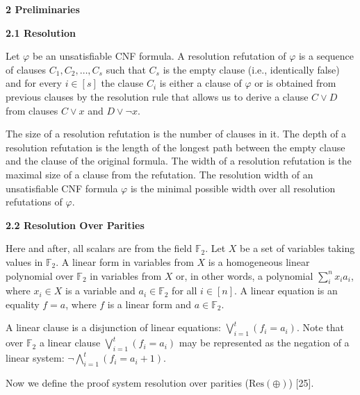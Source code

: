 \par\medskip\noindent\textbf{
2 Preliminaries}\par

\par\medskip\noindent\textbf{
2.1 Resolution}\par


Let $\varphi$ be an unsatisfiable CNF formula. A resolution refutation of $\varphi$ is a sequence of clauses $C_{1},C_{2},\dots,C_{s}$ such that $C_{s}$ is the empty clause (i.e., identically false) and for every $i\in[s]$ the clause $C_{i}$ is either a clause of $\varphi$ or is obtained from previous clauses by the resolution rule that allows us to derive a clause $C\lor D$ from clauses $C\lor x$ and $D\lor\lnot x$.\par



The size of a resolution refutation is the number of clauses in it.
The depth of a resolution refutation is the length of the longest path between the empty clause and the clause of the original formula.
The width of a resolution refutation is the maximal size of a clause from the refutation.
The resolution width of an unsatisfiable CNF formula $\varphi$ is the minimal possible width
over all resolution refutations of $\varphi$.\par


\par\medskip\noindent\textbf{
2.2 Resolution Over Parities}\par


Here and after, all scalars are from the field $\mathbb{F}_{2}$.
Let $X$ be a set of variables taking values in $\mathbb{F}_{2}$.
A linear form in variables from $X$ is a homogeneous linear polynomial over $\mathbb{F}_{2}$ in variables from $X$ or,
in other words, a polynomial $\sum_{i}^{n}x_{i}a_{i}$, where $x_{i}\in X$ is a variable and $a_{i}\in\mathbb{F}_{2}$ for all $i\in[n]$.
A linear equation is an equality $f=a$, where $f$ is a linear form and $a\in\mathbb{F}_{2}$.\par



A linear clause is a disjunction of linear equations: $\bigvee_{i=1}^{t}(f_{i}=a_{i})$.
Note that over $\mathbb{F}_{2}$ a linear clause $\bigvee_{i=1}^{t}(f_{i}=a_{i})$ may be represented
as the negation of a linear system: $\lnot\bigwedge_{i=1}^{t}(f_{i}=a_{i}+1)$.\par



Now we define the proof system resolution over parities ($\mathrm{Res}(\oplus)$) [25].\par



